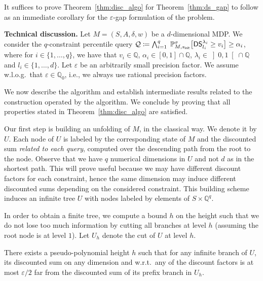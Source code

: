 \documentclass{llncs}
\newcommand{\initState}{\ensuremath{s_{{\sf init}}} }
\newcommand{\weight}{\ensuremath{w} }
\newcommand{\strat}{\ensuremath{\sigma} }
\newcommand*{\pr}{\mathbb{P}}
\newcommand{\discSum}[1]{\ensuremath{{\sf DS}^{#1}} }
\newcommand{\discount}{\ensuremath{\lambda} }
\newcommand{\rat}{\ensuremath{\mathbb{Q}} }
\newcommand{\query}{\ensuremath{\mathcal{Q}} }
\begin{document}
It suffices to prove Theorem~\ref{thm:disc_algo} for Theorem~\ref{thm:ds_gap} to follow as an immediate corollary for the $\varepsilon$-gap formulation of the problem.

\smallskip\noindent\textbf{Technical discussion.} Let $M = (S, A, \delta, \weight)$ be a $d$-dimensional MDP. We consider the $q$-constraint percentile query $\query \coloneqq \bigwedge_{i = 1}^{q}\; \pr_{M,\initState}^\strat\big[\discSum{\discount_{i}}_{l_{i}} \geq v_i\big] \geq
	\alpha_i$, where for $i \in \{1, \ldots{}, q\}$, we have that $v_{i} \in \rat$, $\alpha_{i} \in \left[ 0, 1\right] \cap \rat$, $\discount_{i} \in \left] 0, 1\right[ \cap \rat$ and $l_{i} \in \{1, \ldots{}, d\}$. Let $\varepsilon$ be an arbitrarily small precision factor. We assume w.l.o.g.~that $\varepsilon \in \rat_{0}$, i.e., we always use rational precision factors.
	
We now describe the algorithm and establish intermediate results related to the construction operated by the algorithm. We conclude by proving that all properties stated in Theorem~\ref{thm:disc_algo} are satisfied.

Our first step is building an unfolding of $M$, in the classical way. We denote it by $U$. Each node of $U$ is labeled by the corresponding state of $M$ and the discounted sum \textit{related to each query}, computed over the descending path from the root to the node. Observe that we have $q$ numerical dimensions in $U$ and not $d$ as in the shortest path. This will prove useful because we may have different discount factors for each constraint, hence the same dimension may induce different discounted sums depending on the considered constraint. This building scheme induces an infinite tree $U$ with nodes labeled by elements of $S \times \rat^{q}$.

In order to obtain a finite tree, we compute a bound $h$ on the height such that we do not lose too much information by cutting all branches at level $h$ (assuming the root node is at level $1$). Let $U_{h}$ denote the cut of $U$ at level $h$.

\begin{lemma}
\label{lem:ds_height}
There exists a pseudo-polynomial height $h$ such that for any infinite branch of $U$, its discounted sum on any dimension and w.r.t.~any of the discount factors is at most $\varepsilon/2$ far from the discounted sum of its prefix branch in $U_{h}$.
\end{lemma}
\end{document}
